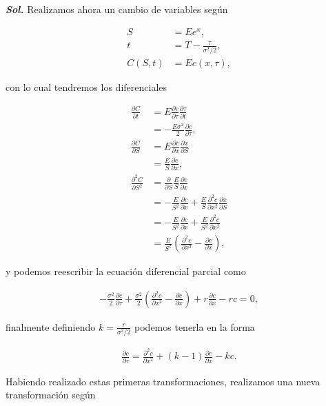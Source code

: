 \documentclass[letter]{article}
\begin{document}
\begin{enumerate}
\begin{enumerate}[label=\alph*)]
\medskip

\textbf{\textit{Sol.}} Realizamos ahora un cambio de variables según

\begin{align*}
    S &= Ee^x,\\
    t &= T - \frac{\tau}{\sigma^2/2},\\
    C(S,t) &= Ec(x,\tau),
\end{align*}

con lo cual tendremos los diferenciales

\begin{align*}
    \frac{\partial C}{\partial t} &= E\frac{\partial c}{\partial \tau}\frac{\partial \tau}{\partial t}\\
    &= -\frac{E\sigma^2}{2}\frac{\partial c}{\partial\tau},\\
    \frac{\partial C}{\partial S} &= E\frac{\partial c}{\partial x}\frac{\partial x}{\partial S}\\
    &= \frac{E}{S}\frac{\partial c}{\partial x},\\
    \frac{\partial^2 C}{\partial S^2} &= \frac{\partial}{\partial S}\frac{E}{S}\frac{\partial c}{\partial x}\\
    &= -\frac{E}{S^2}\frac{\partial c}{\partial x} + \frac{E}{S}\frac{\partial^2 c}{\partial x^2}\frac{\partial x}{\partial S}\\
    &= -\frac{E}{S^2}\frac{\partial c}{\partial x} + \frac{E}{S^2}\frac{\partial^2 c}{\partial x^2}\\
    &= \frac{E}{S^2}\left(\frac{\partial^2 c}{\partial x^2} - \frac{\partial c}{\partial x}\right),
\end{align*}

y podemos reescribir la ecuación diferencial parcial como

\begin{align*}
    -\frac{\sigma^2}{2}\frac{\partial c}{\partial\tau} + \frac{\sigma^2}{2}\left(\frac{\partial^2 c}{\partial x^2} - \frac{\partial c}{\partial x}\right) + r\frac{\partial c}{\partial x} - rc = 0,
\end{align*}

finalmente definiendo $k = \frac{r}{\sigma^2/2}$ podemos tenerla en la forma

\begin{align*}
    \frac{\partial c}{\partial\tau} = \frac{\partial^2c}{\partial x^2} + (k - 1)\frac{\partial c}{\partial x} - kc.
\end{align*}

Habiendo realizado estas primeras transformaciones, realizamos una nueva transformación según


\end{enumerate}
\end{enumerate}
\end{document}
